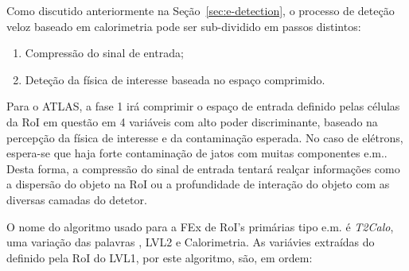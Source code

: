 Como discutido anteriormente na Seção~\ref{sec:e-detection}, o processo de
deteção veloz baseado em calorimetria pode ser sub-dividido em passos distintos:

\begin{enumerate}
\item Compressão do sinal de entrada;
\item Deteção da física de interesse baseada no espaço comprimido.
\end{enumerate}

Para o ATLAS, a fase 1 irá comprimir o espaço de entrada definido pelas
células da RoI em questão em 4 variáveis com alto poder discriminante, baseado
na percepção da física de interesse e da contaminação esperada. No caso de
elétrons, espera-se que haja forte contaminação de jatos com muitas
componentes e.m.. Desta forma, a compressão do sinal de entrada tentará
realçar informações como a dispersão do objeto na RoI ou a profundidade de
interação do objeto com as diversas camadas do detetor. 

O nome do algoritmo usado para a FEx de RoI's primárias tipo e.m. é
\emph{T2Calo}, uma variação das palavras , LVL2 e
Calorimetria. As variávies extraídas do  definido pela RoI do
LVL1, por este algoritmo, são, em ordem:

